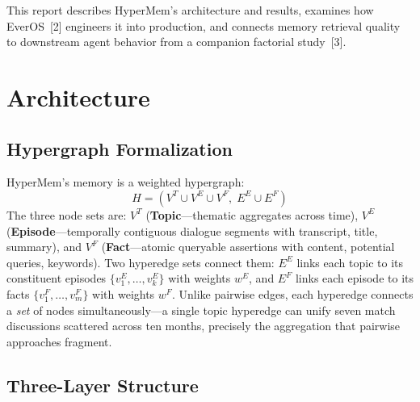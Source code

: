 \documentclass[11pt, a4paper]{article}
\begin{document}
This report describes HyperMem's architecture and results, examines how EverOS~[2] engineers it into production, and connects memory retrieval quality to downstream agent behavior from a companion factorial study~[3].

\section{Architecture}

\subsection{Hypergraph Formalization}

HyperMem's memory is a weighted hypergraph:
\begin{equation}
  H = (V^T \cup V^E \cup V^F,\; E^E \cup E^F)
\end{equation}
The three node sets are: $V^T$ (\textbf{Topic}---thematic aggregates across time), $V^E$ (\textbf{Episode}---temporally contiguous dialogue segments with transcript, title, summary), and $V^F$ (\textbf{Fact}---atomic queryable assertions with content, potential queries, keywords). Two hyperedge sets connect them: $E^E$ links each topic to its constituent episodes $\{v^E_1, \ldots, v^E_k\}$ with weights $w^E$, and $E^F$ links each episode to its facts $\{v^F_1, \ldots, v^F_m\}$ with weights $w^F$. Unlike pairwise edges, each hyperedge connects a \emph{set} of nodes simultaneously---a single topic hyperedge can unify seven match discussions scattered across ten months, precisely the aggregation that pairwise approaches fragment.

\subsection{Three-Layer Structure}
\end{document}
